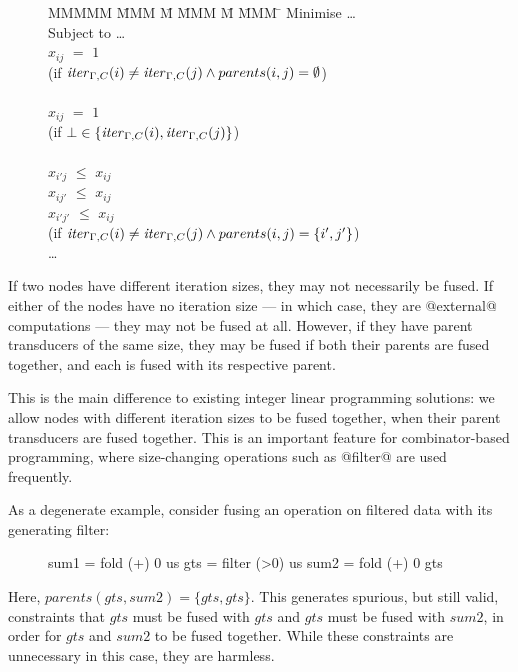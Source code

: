 \begin{figure}[H]
\begin{tabbing}
MMMMM   \= MMM \= M \= MMM \= M \= MMM \= \kill
Minimise   \> \ldots \\
Subject to \> \ldots \\
           \> $x_{ij}$    \> $=$   \> $1$             \>       \>            \\
           \> (if $\mathit{iter}_{\Gamma,C}(i) \not= \mathit{iter}_{\Gamma,C}(j) \wedge parents(i,j) = \emptyset$)  \\
           \\
           \> $x_{ij}$    \> $=$   \> $1$             \>       \>            \\
           \> (if $\bot \in \{\mathit{iter}_{\Gamma,C}(i), \mathit{iter}_{\Gamma,C}(j)\}$)  \\
           \\
           \> $x_{i'j}$   \> $\le$ \> $x_{ij}$        \>       \>            \\
           \> $x_{ij'}$   \> $\le$ \> $x_{ij}$        \>       \>            \\
           \> $x_{i'j'}$   \> $\le$ \> $x_{ij}$        \>       \>            \\
           \> (if $\mathit{iter}_{\Gamma,C}(i) \not= \mathit{iter}_{\Gamma,C}(j) \wedge parents(i,j) = \{i',j'\}$) \\
           \> \ldots
\end{tabbing}
\end{figure}
If two nodes have different iteration sizes, they may not necessarily be fused.
If either of the nodes have no iteration size --- in which case, they are @external@ computations --- they may not be fused at all.
However, if they have parent transducers of the same size, they may be fused if both their parents are fused together, and each is fused with its respective parent.

This is the main difference to existing integer linear programming solutions: we allow nodes with different iteration sizes to be fused together, when their parent transducers are fused together.
This is an important feature for combinator-based programming, where size-changing operations such as @filter@ are used frequently.

As a degenerate example, consider fusing an operation on filtered data with its generating filter:
\begin{figure}[H]
\begin{code}
 sum1 = fold (+) 0  us
 gts  = filter (>0) us
 sum2 = fold (+) 0  gts
\end{code}
\end{figure}
Here, $parents(gts,sum2) = \{gts, gts\}$.
This generates spurious, but still valid, constraints that $gts$ must be fused with $gts$ and $gts$ must be fused with $sum2$, in order for $gts$ and $sum2$ to be fused together.
While these constraints are unnecessary in this case, they are harmless.


